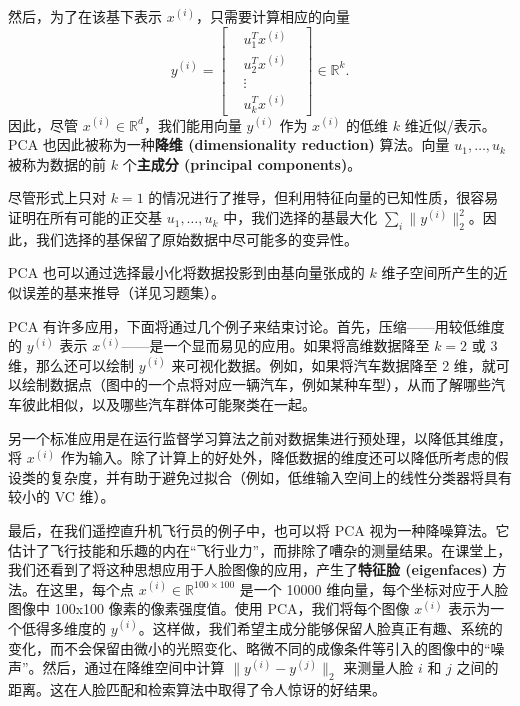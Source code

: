 然后，为了在该基下表示 $x^{(i)}$，只需要计算相应的向量
\[
    y^{(i)} = 
    \begin{bmatrix} 
        & u_1^T x^{(i)} & \\
        & u_2^T x^{(i)} & \\
        & \vdots & \\
        & u_k^T x^{(i)} & 
    \end{bmatrix} 
    \in \mathbb{R}^k.
\]
因此，尽管 $x^{(i)} \in \mathbb{R}^d$，我们能用向量 $y^{(i)}$ 作为 $x^{(i)}$ 的低维 $k$ 维近似/表示。PCA 也因此被称为一种\textbf{降维 (dimensionality reduction)} 算法。向量 $u_1, \dots, u_k$ 被称为数据的前 $k$ 个\textbf{主成分 (principal components)}。

\begin{remark*}
    尽管形式上只对 $k=1$ 的情况进行了推导，但利用特征向量的已知性质，很容易证明在所有可能的正交基 $u_1, \dots, u_k$ 中，我们选择的基最大化 $\sum_i \|y^{(i)}\|_2^2$。因此，我们选择的基保留了原始数据中尽可能多的变异性。
\end{remark*}


PCA 也可以通过选择最小化将数据投影到由基向量张成的 $k$ 维子空间所产生的近似误差的基来推导（详见习题集）。

PCA 有许多应用，下面将通过几个例子来结束讨论。首先，压缩——用较低维度的 $y^{(i)}$ 表示 $x^{(i)}$——是一个显而易见的应用。如果将高维数据降至 $k=2$ 或 3 维，那么还可以绘制 $y^{(i)}$ 来可视化数据。例如，如果将汽车数据降至 2 维，就可以绘制数据点（图中的一个点将对应一辆汽车，例如某种车型），从而了解哪些汽车彼此相似，以及哪些汽车群体可能聚类在一起。

另一个标准应用是在运行监督学习算法之前对数据集进行预处理，以降低其维度，将 $x^{(i)}$ 作为输入。除了计算上的好处外，降低数据的维度还可以降低所考虑的假设类的复杂度，并有助于避免过拟合（例如，低维输入空间上的线性分类器将具有较小的 VC 维）。

最后，在我们遥控直升机飞行员的例子中，也可以将 PCA 视为一种降噪算法。它估计了飞行技能和乐趣的内在“飞行业力”，而排除了嘈杂的测量结果。在课堂上，我们还看到了将这种思想应用于人脸图像的应用，产生了\textbf{特征脸 (eigenfaces)} 方法。在这里，每个点 $x^{(i)} \in \mathbb{R}^{100 \times 100}$ 是一个 10000 维向量，每个坐标对应于人脸图像中 100x100 像素的像素强度值。使用 PCA，我们将每个图像 $x^{(i)}$ 表示为一个低得多维度的 $y^{(i)}$。这样做，我们希望主成分能够保留人脸真正有趣、系统的变化，而不会保留由微小的光照变化、略微不同的成像条件等引入的图像中的“噪声”。然后，通过在降维空间中计算 $\|y^{(i)} - y^{(j)}\|_2$ 来测量人脸 $i$ 和 $j$ 之间的距离。这在人脸匹配和检索算法中取得了令人惊讶的好结果。